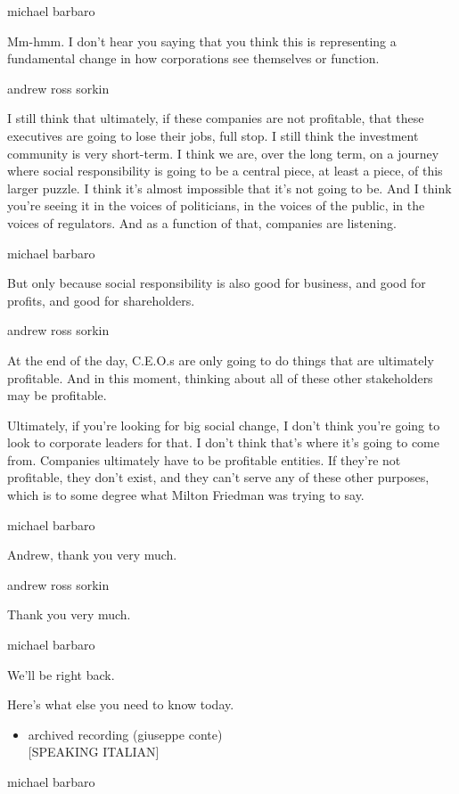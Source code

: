 michael barbaro

Mm-hmm. I don't hear you saying that you think this is representing a
fundamental change in how corporations see themselves or function.

andrew ross sorkin

I still think that ultimately, if these companies are not profitable,
that these executives are going to lose their jobs, full stop. I still
think the investment community is very short-term. I think we are, over
the long term, on a journey where social responsibility is going to be a
central piece, at least a piece, of this larger puzzle. I think it's
almost impossible that it's not going to be. And I think you're seeing
it in the voices of politicians, in the voices of the public, in the
voices of regulators. And as a function of that, companies are
listening.

michael barbaro

But only because social responsibility is also good for business, and
good for profits, and good for shareholders.

andrew ross sorkin

At the end of the day, C.E.O.s are only going to do things that are
ultimately profitable. And in this moment, thinking about all of these
other stakeholders may be profitable.

Ultimately, if you're looking for big social change, I don't think
you're going to look to corporate leaders for that. I don't think that's
where it's going to come from. Companies ultimately have to be
profitable entities. If they're not profitable, they don't exist, and
they can't serve any of these other purposes, which is to some degree
what Milton Friedman was trying to say.

michael barbaro

Andrew, thank you very much.

andrew ross sorkin

Thank you very much.

michael barbaro

We'll be right back.

Here's what else you need to know today.

\begin{itemize}
\tightlist
\item
  archived recording (giuseppe conte)\\
  {[}SPEAKING ITALIAN{]}
\end{itemize}

michael barbaro

